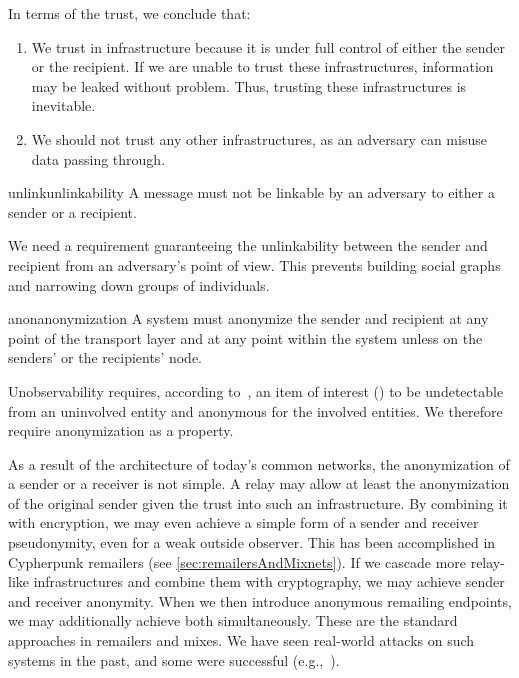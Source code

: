 In terms of the trust, we conclude that:
\begin{enumerate}
	\item We trust in infrastructure because it is under full control of either the sender or the recipient. If we are unable to trust these infrastructures, information may be leaked without problem. Thus, trusting these infrastructures is inevitable.
	\item We should not trust any other infrastructures, as an adversary can misuse data passing through.
\end{enumerate}

\begin{requirement}{unlink}{unlinkability}
	A message must not be linkable by an adversary to either a sender or a recipient.
\end{requirement}

We need a requirement guaranteeing the unlinkability between the sender and recipient from an adversary's point of view. This prevents building social graphs and narrowing down groups of individuals.

\begin{requirement}{anon}{anonymization}
	A system must anonymize the sender and recipient at any point of the transport layer and at any point within the system unless on the senders' or the recipients' node.
\end{requirement}

Unobservability requires, according to~\cite{anonTerminology}, an item of interest () to be undetectable from an uninvolved entity and anonymous for the involved entities. We therefore require anonymization as a property.

As a result of the architecture of today's common networks, the anonymization of a sender or a receiver is not simple. A relay may allow at least the anonymization of the original sender given the trust into such an infrastructure. 
By combining it with encryption, we may even achieve a simple form of a sender and receiver pseudonymity, even for a weak outside observer. This has been accomplished in Cypherpunk remailers (see \cref{sec:remailersAndMixnets}). If we cascade more relay-like infrastructures and combine them with cryptography, we may achieve sender and receiver anonymity. When we then introduce anonymous remailing endpoints, we may additionally achieve both simultaneously. These are the standard approaches in remailers and mixes. We have seen real-world attacks on such systems in the past, and some were successful (e.g.,~\cite{penetClosure}). 

